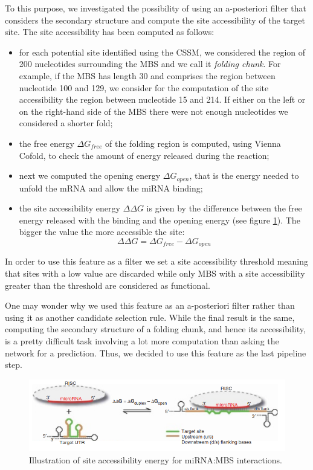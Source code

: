To this purpose, we investigated the possibility of using an a-posteriori filter that considers the secondary structure and compute the site accessibility of the target site. The site accessibility has been computed as follows:
\begin{itemize}
	\item for each potential site identified using the CSSM, we considered the region of 200 nucleotides surrounding the MBS and we call it \emph{folding chunk}. For example, if the MBS has length 30 and comprises the region between nucleotide 100 and 129, we consider for the computation of the site accessibility the region between nucleotide 15 and 214. If either on the left or on the right-hand side of the MBS there were not enough nucleotides we considered a shorter fold;
	\item the free energy $\Delta G_{free}$ of the folding region is computed, using Vienna Cofold, to check the amount of energy released during the reaction;
	\item next we computed the opening energy $\Delta G_{open}$, that is the energy needed to unfold the mRNA and allow the miRNA binding;
	\item the site accessibility energy $\Delta\Delta G$ is given by the difference between the free energy released with the binding and the opening energy (see figure \ref{fig:site_accessibility}). The bigger the value the more accessible the site:
	$$\Delta\Delta G = \Delta G_{free} - \Delta G_{open}$$ 
\end{itemize}    

In order to use this feature as a filter we set a site accessibility threshold meaning that sites with a low value are discarded while only MBS with a site accessibility greater than the threshold are considered as functional. 

One may wonder why we used this feature as an a-posteriori filter rather than using it as another candidate selection rule. While the final result is the same, computing the secondary structure of a folding chunk, and hence its accessibility, is a pretty difficult task involving a lot more computation than asking the network for a prediction. Thus, we decided to use this feature as the last pipeline step.

\begin{figure}[hbt!]
	\centering
	\includegraphics[width=1\textwidth]{Figures/site_accessibility}
	\caption{Illustration of site accessibility energy for miRNA:MBS interactions.}
	\label{fig:site_accessibility}
\end{figure}




